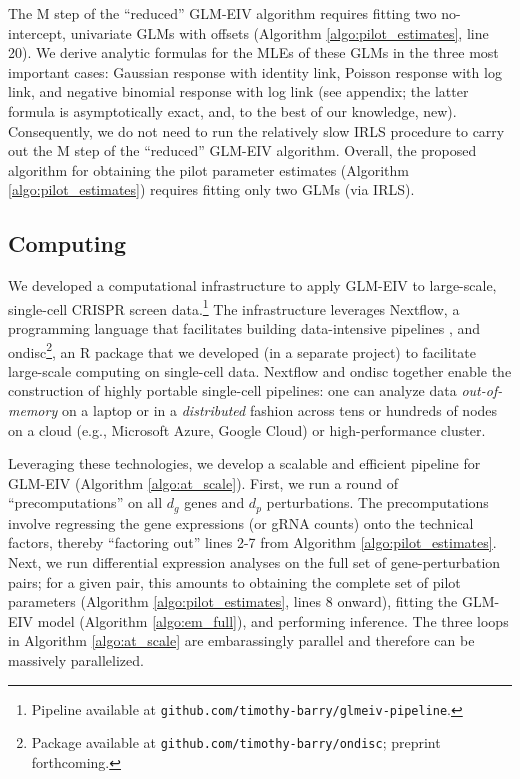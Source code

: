 \documentclass[12pt]{article}
\begin{document}
The M step of the ``reduced'' GLM-EIV algorithm requires fitting two no-intercept, univariate GLMs with offsets (Algorithm \ref{algo:pilot_estimates}, line 20). We derive analytic formulas for the MLEs of these GLMs in the three most important cases: Gaussian response with identity link, Poisson response with log link, and negative binomial response with log link (see appendix; the latter formula is asymptotically exact, and, to the best of our knowledge, new). Consequently, we do not need to run the relatively slow IRLS procedure to carry out the M step of the ``reduced'' GLM-EIV algorithm. Overall, the proposed algorithm for obtaining the pilot parameter estimates (Algorithm \ref{algo:pilot_estimates}) requires fitting only two GLMs (via IRLS).

\subsection{Computing}
We developed a computational infrastructure to apply GLM-EIV to large-scale, single-cell CRISPR screen data.\footnote{Pipeline available at \texttt{github.com/timothy-barry/glmeiv-pipeline}.} The infrastructure leverages Nextflow, a programming language that facilitates building data-intensive pipelines \cite{DITommaso2017}, and ondisc\footnote{Package available at \texttt{github.com/timothy-barry/ondisc}; preprint forthcoming.}, an R package that we developed (in a separate project) to facilitate large-scale computing on single-cell data. Nextflow and ondisc together enable the construction of highly portable single-cell pipelines: one can analyze data \textit{out-of-memory} on a laptop or in a \textit{distributed} fashion across tens or hundreds of nodes on a cloud (e.g., Microsoft Azure, Google Cloud) or high-performance cluster.

Leveraging these technologies, we develop a scalable and efficient pipeline for GLM-EIV (Algorithm \ref{algo:at_scale}). First, we run a round of ``precomputations'' on all $d_g$ genes and $d_p$ perturbations. The precomputations involve regressing the gene expressions (or gRNA counts) onto the technical factors, thereby ``factoring out'' lines 2-7 from Algorithm \ref{algo:pilot_estimates}. Next, we run differential expression analyses on the full set of gene-perturbation pairs; for a given pair, this amounts to obtaining the complete set of pilot parameters (Algorithm \ref{algo:pilot_estimates}, lines 8 onward), fitting the GLM-EIV model (Algorithm \ref{algo:em_full}), and performing inference. The three loops in Algorithm \ref{algo:at_scale} are embarassingly parallel and therefore can be massively parallelized. 
\end{document}
